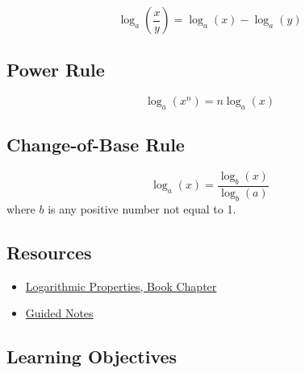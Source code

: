 \[
\log_a \left(\frac{x}{y}\right) = \log_a(x) - \log_a(y)
\]

\subsection{Power Rule}
\label{sss:powe-f8c4}

\[
\log_a(x^n) = n \log_a(x)
\]

\subsection{Change-of-Base Rule}
\label{sss:chan-eefd}

\[
\log_a(x) = \frac{\log_b(x)}{\log_b(a)}
\]
where $b$ is any positive number not equal to 1.

\subsection{Resources}
\label{sss:reso-55b5}

\begin{itemize}
    \item \href{https://mathresearch.utsa.edu/wikiFiles/MAT1053/Logarithmic\%20Properties/MAT1053_M6.1Logarithmic_Properties.pdf}{Logarithmic Properties, Book Chapter}
    \item \href{https://mathresearch.utsa.edu/wikiFiles/MAT1053/Logarithmic\%20Properties/MAT1053_M6.1Logarithmic_PropertiesGN.pdf}{Guided Notes}
\end{itemize}

\subsection{Learning Objectives}
\label{ssec:lear-f632}


